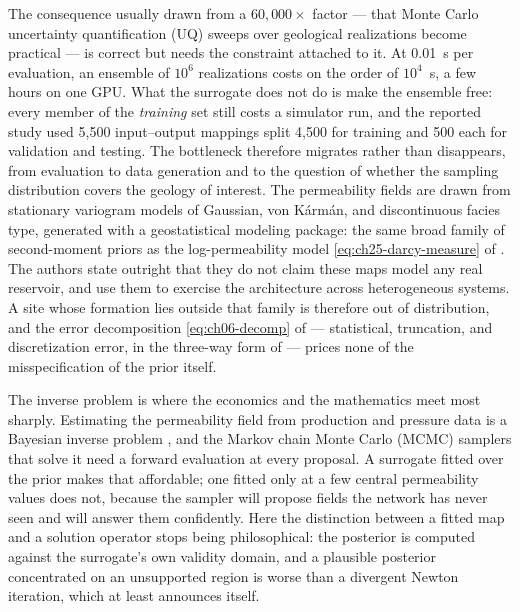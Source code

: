 The consequence usually drawn from a $60{,}000\times$ factor --- that Monte Carlo
uncertainty quantification (UQ) sweeps over geological realizations become
practical --- is correct but needs the constraint attached to it. At
0.01~s per evaluation, an ensemble of $10^6$ realizations costs on the order of
$10^4$~s, a few hours on one GPU. What the surrogate does not do is make the
ensemble free: every member of the \emph{training} set still costs a simulator run,
and the reported study used 5{,}500 input--output mappings split 4{,}500 for
training and 500 each for validation and testing. The bottleneck therefore migrates
rather than disappears, from evaluation to data generation and to the question of
whether the sampling distribution covers the geology of interest. The permeability
fields are drawn from stationary variogram models of Gaussian, von K\'arm\'an, and
discontinuous facies type, generated with a geostatistical modeling package: the
same broad family of second-moment priors as the
log-permeability model \eqref{eq:ch25-darcy-measure} of
. The authors state
outright that they do not claim these maps model any real reservoir, and use them
to exercise the architecture across heterogeneous systems. A site whose
formation lies outside that family is therefore out of distribution, and the error
decomposition \eqref{eq:ch06-decomp} of 
--- statistical, truncation, and discretization error, in the three-way form
of \cite{subedi2024controlling} --- prices none of the misspecification of the
prior itself.

The inverse problem is where the economics and the mathematics meet most
sharply. Estimating the permeability field from production and pressure data is a
Bayesian inverse problem \cite{stuart2010inverse}, and the Markov chain Monte Carlo
(MCMC) samplers that solve it need a forward evaluation at every proposal. A
surrogate fitted over the prior makes that affordable; one fitted only at a few
central permeability values does not, because the sampler will propose fields the
network has never seen and will answer them confidently. Here the distinction
between a fitted map and a solution operator stops being philosophical: the
posterior is computed against the surrogate's own validity domain, and a plausible
posterior concentrated on an unsupported region is worse than a divergent Newton
iteration, which at least announces itself.

